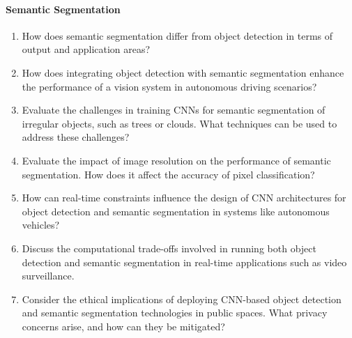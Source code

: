 \paragraph*{Semantic Segmentation}
\begin{enumerate}
    \item How does semantic segmentation differ from object detection in terms of output and application areas?
    \item How does integrating object detection with semantic segmentation enhance the performance of a vision system in autonomous driving scenarios?
    \item Evaluate the challenges in training CNNs for semantic segmentation of irregular objects, such as trees or clouds. What techniques can be used to address these challenges?
    \item Evaluate the impact of image resolution on the performance of semantic segmentation. How does it affect the accuracy of pixel classification?
    \item How can real-time constraints influence the design of CNN architectures for object detection and semantic segmentation in systems like autonomous vehicles?
    \item Discuss the computational trade-offs involved in running both object detection and semantic segmentation in real-time applications such as video surveillance.
    \item Consider the ethical implications of deploying CNN-based object detection and semantic segmentation technologies in public spaces. What privacy concerns arise, and how can they be mitigated?
\end{enumerate}
